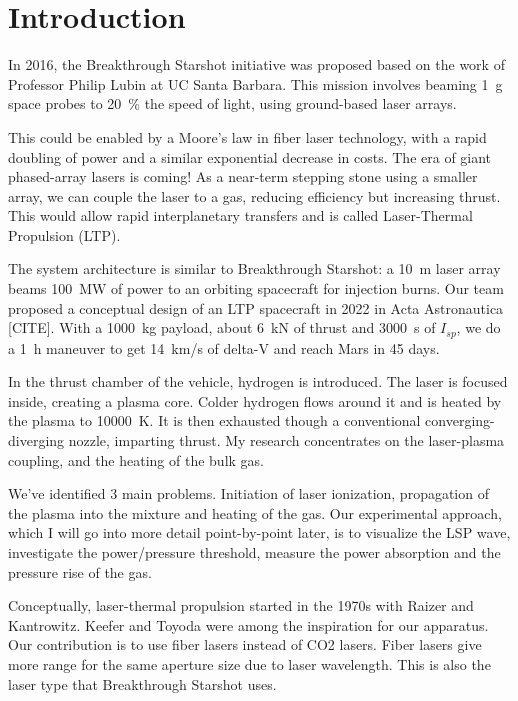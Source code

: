 \chapter{Introduction} \label{chp:intro}
    In 2016, the Breakthrough Starshot initiative was proposed based on the work of Professor Philip Lubin at UC Santa Barbara. This mission involves beaming \qty{1}{g} space probes to \qty{20}{\%} the speed of light, using ground-based laser arrays.

    This could be enabled by a Moore's law in fiber laser technology, with a rapid doubling of power and a similar exponential decrease in costs. The era of giant phased-array lasers is coming! As a near-term stepping stone using a smaller array, we can couple the laser to a gas, reducing efficiency but increasing thrust. This would allow rapid interplanetary transfers and is called Laser-Thermal Propulsion (LTP).

    The system architecture is similar to Breakthrough Starshot: a \qty{10}{m} laser array beams \qty{100}{MW} of power to an orbiting spacecraft for injection burns. Our team proposed a conceptual design of an LTP spacecraft in 2022 in Acta Astronautica [CITE]. With a \qty{1000}{kg} payload, about \qty{6}{kN} of thrust and \qty{3000}{s} of $I_{sp}$, we do a \qty{1}{h} maneuver to get \qty{14}{km/s} of delta-V and reach Mars in 45 days.

    In the thrust chamber of the vehicle, hydrogen is introduced. The laser is focused inside, creating a plasma core. Colder hydrogen flows around it and is heated by the plasma to \qty{10000}{K}. It is then exhausted though a conventional converging-diverging nozzle, imparting thrust. My research concentrates on the laser-plasma coupling, and the heating of the bulk gas.

    We've identified 3 main problems. Initiation of laser ionization, propagation of the plasma into the mixture and heating of the gas. Our experimental approach, which I will go into more detail point-by-point later, is to visualize the LSP wave, investigate the power/pressure threshold, measure the power absorption and the pressure rise of the gas.

    Conceptually, laser-thermal propulsion started in the 1970s with Raizer and Kantrowitz. Keefer and Toyoda were among the inspiration for our apparatus. Our contribution is to use fiber lasers instead of CO2 lasers. Fiber lasers give more range for the same aperture size due to laser wavelength. This is also the laser type that Breakthrough Starshot uses. 
    
